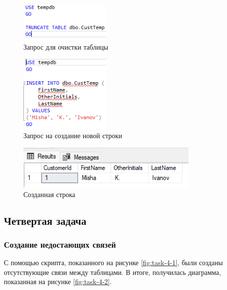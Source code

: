 \documentclass[a4paper, 14pt]{extarticle}
\begin{document}
\begin{figure}[H]
  \centering
  \includegraphics[width=0.4\textwidth]{images/task-3/8.png}
  \caption{Запрос для очистки таблицы}
  \label{fig:task-3-8}
\end{figure}

\begin{figure}[H]
  \centering
  \includegraphics[width=0.4\textwidth]{images/task-3/9.png}
  \caption{Запрос на создание новой строки}
  \label{fig:task-3-9}
\end{figure}

\begin{figure}[H]
  \centering
  \includegraphics[width=0.8\textwidth]{images/task-3/10.png}
  \caption{Созданная строка}
  \label{fig:task-3-10}
\end{figure}

\subsection{Четвертая задача}

\subsubsection{Создание недостающих связей}

С помощью скрипта, показанного на рисунке \ref{fig:task-4-1}, были созданы
отсутствующие связи между таблицами. В итоге, получилась диаграмма, показанная
на рисунке \ref{fig:task-4-2}.
\end{document}
